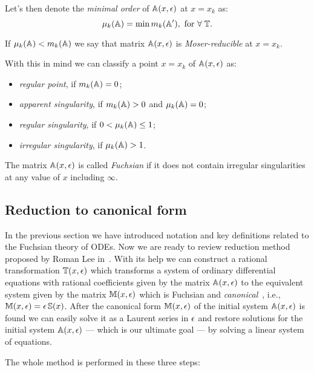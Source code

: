 \documentclass[12pt,a4paper]{article}
\begin{document}
Let's then denote the {\em minimal order} of $\mathbb{A}(x,\epsilon)$ at $x=x_k$ as:
\begin{equation}
\label{eq:muk}
  \mu_k(\mathbb{A}) = \min m_k(\mathbb{A}'), \text{ for } \forall \; \mathbb{T}.
\end{equation}

If $\mu_k(\mathbb{A}) < m_k(\mathbb{A})$ we say that matrix $\mathbb{A}(x,\epsilon)$ is {\em Moser-reducible} at $x=x_k$.

With this in mind we can classify a point $x=x_k$ of $\mathbb{A}(x,\epsilon)$ as:
\begin{itemize}
  \item {\em regular point}, if $m_k(\mathbb{A}) = 0$;
  \item {\em apparent singularity}, if $m_k(\mathbb{A}) > 0$ and $\mu_k(\mathbb{A}) = 0$;
  \item {\em regular singularity}, if $0 < \mu_k(\mathbb{A}) \le 1$;
  \item {\em irregular singularity}, if $\mu_k(\mathbb{A}) > 1$.
\end{itemize}
The matrix $\mathbb{A}(x,\epsilon)$ is called {\em Fuchsian} if it does not contain irregular singularities at any value of $x$ including $\infty$.


\subsection{Reduction to canonical form}

In the previous section we have introduced notation and key definitions related to the Fuchsian theory of ODEs.
Now we are ready to review reduction method proposed by Roman Lee in~\cite{Lee15}.
With its help we can construct a rational transformation $\mathbb{T}(x,\epsilon)$ which transforms a system of ordinary differential equations with rational coefficients given by the matrix $\mathbb{A}(x,\epsilon)$ to the equivalent system given by the matrix $\mathbb{M}(x,\epsilon)$ which is Fuchsian and {\em canonical}~\cite{Henn13}, i.e., $\mathbb{M}(x,\epsilon) = \epsilon\, \mathbb{S}(x)$.
After the canonical form $\mathbb{M}(x,\epsilon)$ of the initial system $\mathbb{A}(x,\epsilon)$ is found we can easily solve it as a Laurent series in $\epsilon$ and restore solutions for the initial system $\mathbb{A}(x,\epsilon)$ --- which is our ultimate goal --- by solving a linear system of equations.

The whole method is performed in these three steps:
\end{document}
